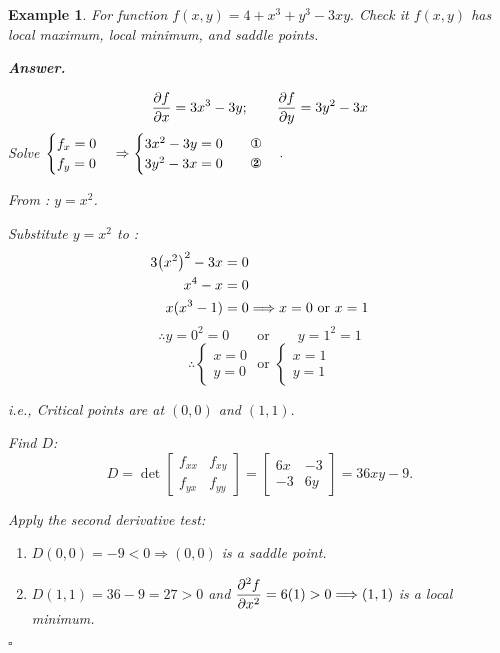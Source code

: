 \documentclass[12pt,a4paper]{article}
\newtheorem{eg}{Example}[subsection]
\newenvironment*{ans}{\par\indent\textbf{\textit{Answer. }}\par}{\par\hfill{$\square$}\par}
\begin{document}
\begin{eg}
	For function $f(x,y)=4+x^3+y^3-3xy.$ Check it $f(x,y)$ has local maximum, local minimum, and saddle points.
	\begin{ans}
		\[\pdv{f}{x}=3x^3-3y;\qquad\pdv{f}{y}=3y^2-3x\]
	Solve $\begin{cases}f_x=0\\f_y=0\end{cases}\Rightarrow\begin{cases}3x^2-3y=0\qquad\text{\ding{172}}\\3y^2-3x=0\qquad\text{\ding{173}}\end{cases}.$\par From : $y=x^2$.\par Substitute $y=x^2$ to : \[\begin{aligned}3\qty(x^2)^2-3x&=0\\x^4-x&=0\\x(x^3-1)&=0\Longrightarrow x=0\text{ or }x=1\end{aligned}\]\[\therefore y=0^2=0\qquad\text{or}\qquad y=1^2=1\]\[\therefore\begin{cases}x=0\\y=0\end{cases}\text{ or }\begin{cases}x=1\\y=1\end{cases}\]\par i.e., Critical points are at $(0,0)$ and $(1,1).$\par Find $D$: \[D=\det\begin{bmatrix}f_{xx}&f_{xy}\\f_{yx}&f_{yy}\end{bmatrix}=\begin{bmatrix}6x&-3\\-3&6y\end{bmatrix}=36xy-9.\]\par Apply the second derivative test: \begin{enumerate}
		\item $D(0,0)=-9<0\Longrightarrow(0,0)$ is a saddle point.
		\item $D(1,1)=36-9=27>0$ and $\displaystyle\pdv[2]{f}{x}(1,1)=6(1)>0\Longrightarrow(1,1)$ is a local minimum. \end{enumerate}
	\end{ans}
\end{eg}
\end{document}
